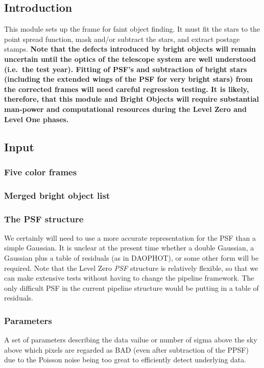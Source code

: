 
\subsection{Introduction}

This module sets up the frame for faint object finding.  It must fit
the stars to the point spread function, mask and/or subtract the stars,
and extract postage stamps.
{\bf Note that the defects introduced by bright objects will
remain uncertain until the optics of the telescope system are well
understood (i.e.\ the test year). Fitting of PSF's and subtraction of
bright stars (including the extended wings of the PSF for very bright
stars) from the corrected frames will need
careful regression testing.
It is likely, therefore, that this module and {\bf Bright Objects}
will require substantial
man-power and computational resources during the Level Zero
and Level One phases.}

\subsection{Input}

\subsubsection{Five color frames}
\subsubsection{Merged bright object list}
\subsubsection{The PSF structure}
We certainly will need to use a more accurate representation
for the PSF than a simple Gaussian.  It is unclear at the present
time whether a double Gaussian, a Gaussian plus a table of
residuals (as in DAOPHOT), or some other form will be required.  Note that
the Level Zero {\it PSF} structure is relatively flexible, so
that we can make extensive tests without having to change
the pipeline framework.  The only difficult PSF in the current pipeline
structure would be putting in a table of residuals.
\subsubsection{Parameters}
A set of parameters describing the data vailue or number of sigma above
the sky above which pixels are regarded as BAD (even after subtraction
of the PPSF) due to the Poisson noise being too great to efficiently detect
underlying data.

